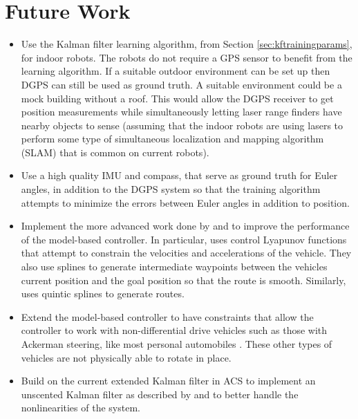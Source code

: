 \chapter{Future Work}
\label{ch:futurework}

\begin{itemize}
\item Use the Kalman filter learning algorithm, from Section \ref{sec:kftrainingparams}, for indoor robots. The robots do not require a GPS sensor to benefit from the learning algorithm. If a suitable outdoor environment can be set up then DGPS can still be used as ground truth. A suitable environment could be a mock building without a roof. This would allow the DGPS receiver to get position measurements while simultaneously letting laser range finders have nearby objects to sense (assuming that the indoor robots are using lasers to perform some type of simultaneous localization and mapping algorithm (SLAM) that is common on current robots).
\item Use a high quality IMU and compass, that serve as ground truth for Euler angles, in addition to the DGPS system so that the training algorithm attempts to minimize the errors between Euler angles in addition to position.
\item Implement the more advanced work done by \cite{Lapierre06} and \cite{Gulati08} to improve the performance of the model-based controller. In particular, \cite{Gulati08} uses control Lyapunov functions that attempt to constrain the velocities and accelerations of the vehicle. They also use splines to generate intermediate waypoints between the vehicles current position and the goal position so that the route is smooth. Similarly, \cite{Burgard09} uses quintic splines to generate routes.
\item Extend the model-based controller to have constraints that allow the controller to work with non-differential drive vehicles such as those with Ackerman steering, like most personal automobiles \cite{Shiller91dynamicmotion}. These other types of vehicles are not physically able to rotate in place.
\item Build on the current extended Kalman filter in ACS to implement an unscented Kalman filter as described by \cite{ThrunProbRobots06} and \cite{Orderud05} to better handle the nonlinearities of the system.
\end{itemize}
